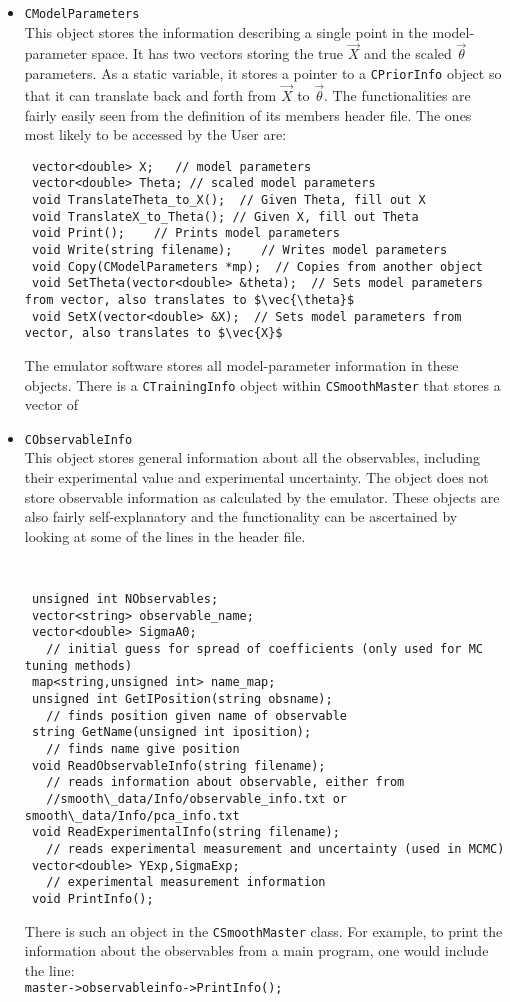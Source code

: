 \documentclass[UserManual.tex]{subfiles}
\begin{document}
\begin{itemize}
\item {\tt CModelParameters}\\
This object stores the information describing a single point in the model-parameter space. It has two vectors storing the true $\vec{X}$ and the scaled $\vec{\theta}$ parameters. As a static variable, it stores a pointer to a {\tt CPriorInfo} object so that it can translate back and forth from $\vec{X}$ to $\vec{\theta}$. The functionalities are fairly easily seen from the definition of its members header file. The ones most likely to be accessed by the User are:
{\tt\begin{verbatim}
 vector<double> X;   // model parameters
 vector<double> Theta; // scaled model parameters
 void TranslateTheta_to_X();  // Given Theta, fill out X
 void TranslateX_to_Theta(); // Given X, fill out Theta
 void Print();    // Prints model parameters
 void Write(string filename);    // Writes model parameters
 void Copy(CModelParameters *mp);  // Copies from another object
 void SetTheta(vector<double> &theta);  // Sets model parameters from vector, also translates to $\vec{\theta}$
 void SetX(vector<double> &X);  // Sets model parameters from vector, also translates to $\vec{X}$
\end{verbatim}}
The emulator software stores all model-parameter information in these objects. There is a {\tt CTrainingInfo} object within {\tt CSmoothMaster} that stores a vector of 

\item {\tt CObservableInfo}\\
This object stores general information about all the observables, including their experimental value and experimental uncertainty. The object does not store observable information as calculated by the emulator. These objects are also fairly self-explanatory and the functionality can be ascertained by looking at some of the lines in the header file. 
{\tt
\begin{verbatim}
 unsigned int NObservables;
 vector<string> observable_name;
 vector<double> SigmaA0;
   // initial guess for spread of coefficients (only used for MC tuning methods)
 map<string,unsigned int> name_map;
 unsigned int GetIPosition(string obsname);
   // finds position given name of observable
 string GetName(unsigned int iposition);
   // finds name give position
 void ReadObservableInfo(string filename);
   // reads information about observable, either from
   //smooth\_data/Info/observable_info.txt or smooth\_data/Info/pca_info.txt 
 void ReadExperimentalInfo(string filename);
   // reads experimental measurement and uncertainty (used in MCMC)
 vector<double> YExp,SigmaExp;
   // experimental measurement information
 void PrintInfo();
\end{verbatim}}

There is such an object in the {\tt CSmoothMaster} class. For example, to print the information about the observables from a main program, one would include the line:\\
 {\tt master->observableinfo->PrintInfo();}


\end{itemize}
\end{document}
